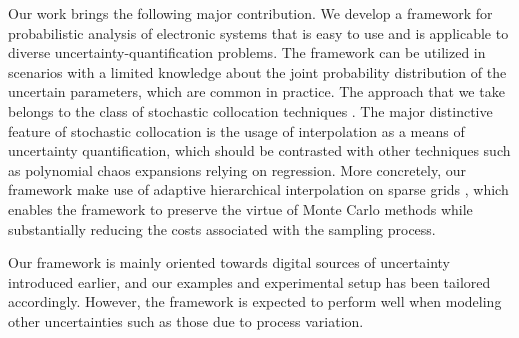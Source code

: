 Our work brings the following major contribution. We develop a framework for
probabilistic analysis of electronic systems that is easy to use and is
applicable to diverse uncertainty-quantification problems. The framework can be
utilized in scenarios with a limited knowledge about the joint probability
distribution of the uncertain parameters, which are common in practice. The
approach that we take belongs to the class of stochastic collocation techniques
\cite{xiu2010}. The major distinctive feature of stochastic collocation is the
usage of interpolation as a means of uncertainty quantification, which should be
contrasted with other techniques such as polynomial chaos expansions relying on
regression. More concretely, our framework make use of adaptive hierarchical
interpolation on sparse grids \cite{klimke2006, ma2009}, which enables the
framework to preserve the virtue of Monte Carlo methods while substantially
reducing the costs associated with the sampling process.

Our framework is mainly oriented towards digital sources of uncertainty
introduced earlier, and our examples and experimental setup has been tailored
accordingly. However, the framework is expected to perform well when modeling
other uncertainties such as those due to process variation.
